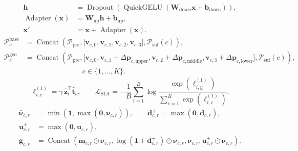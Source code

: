 \documentclass{article}
\begin{document}
\begin{equation}
\begin{aligned}
\mathbf{h}
&= \operatorname{Dropout}\!\left(
   \operatorname{QuickGELU}\!\left(
   \mathbf{W}_{\mathrm{down}}\mathbf{x}
   + \mathbf{b}_{\mathrm{down}}
   \right)\right), \\
\operatorname{Adapter}(\mathbf{x})
&= \mathbf{W}_{\mathrm{up}}\mathbf{h}
   + \mathbf{b}_{\mathrm{up}}, \\
\mathbf{x}'
&= \mathbf{x}+\operatorname{Adapter}(\mathbf{x}).
\end{aligned}
\tag{1}
\end{equation}
\begin{equation}
\begin{aligned}
\mathcal{P}^{\mathrm{base}}_c
&=
\operatorname{Concat}\!\left(
\mathcal{P}_{\mathrm{pre}},
\bigl[
\mathbf{v}_{c,0},
\mathbf{v}_{c,1},
\mathbf{v}_{c,2},
\mathbf{v}_{c,3}
\bigr],
\mathcal{P}_{\mathrm{suf}}(c)
\right), \\
\mathcal{P}^{\mathrm{geo}}_c
&=
\operatorname{Concat}\!\left(
\mathcal{P}_{\mathrm{pre}},
\bigl[
\mathbf{v}_{c,0},
\mathbf{v}_{c,1}+\Delta\mathbf{p}_{c,\mathrm{upper}},
\mathbf{v}_{c,2}+\Delta\mathbf{p}_{c,\mathrm{middle}},
\mathbf{v}_{c,3}+\Delta\mathbf{p}_{c,\mathrm{lower}}
\bigr],
\mathcal{P}_{\mathrm{suf}}(c)
\right), \\
&\hspace{8em}c\in\{1,\ldots,K\}.
\end{aligned}
\tag{2}
\end{equation}
\begin{equation}
\ell^{(1)}_{i,c}
=
\gamma\,\widehat{\mathbf{z}}_i^{\top}\widehat{\mathbf{t}}_c,
\qquad
\mathcal{L}_{\mathrm{S1A}}
=
-\frac{1}{B}\sum_{i=1}^{B}
\log
\frac{\exp\!\left(\ell^{(1)}_{i,y_i}\right)}
{\sum_{c=1}^{K}\exp\!\left(\ell^{(1)}_{i,c}\right)}.
\tag{3}
\end{equation}
\begin{equation}
\begin{aligned}
\bar{\boldsymbol{\nu}}_{c,r}
&=\min\!\left(\mathbf{1},\max\!\left(\mathbf{0},\boldsymbol{\nu}_{c,r}\right)\right),
\qquad
\mathbf{d}^{+}_{c,r}=\max\!\left(\mathbf{0},\mathbf{d}_{c,r}\right), \\
\mathbf{u}^{+}_{c,r}
&=\max\!\left(\mathbf{0},\mathbf{u}_{c,r}\right), \\
\mathbf{g}_{c,r}
&=
\operatorname{Concat}\!\left(
\mathbf{m}_{c,r}\odot\bar{\boldsymbol{\nu}}_{c,r},
\log\!\left(\mathbf{1}+\mathbf{d}^{+}_{c,r}\right)\odot\bar{\boldsymbol{\nu}}_{c,r},
\bar{\boldsymbol{\nu}}_{c,r},
\mathbf{u}^{+}_{c,r}\odot\bar{\boldsymbol{\nu}}_{c,r}
\right).
\end{aligned}
\tag{4}
\end{equation}
\end{document}
